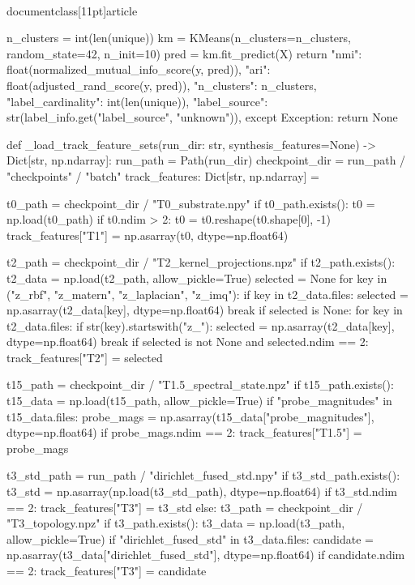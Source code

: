 \\documentclass[11pt]{article}
\begin{document}
\begin{CodeBlock}
        n_clusters = int(len(unique))
        km = KMeans(n_clusters=n_clusters, random_state=42, n_init=10)
        pred = km.fit_predict(X)
        return {
            "nmi": float(normalized_mutual_info_score(y, pred)),
            "ari": float(adjusted_rand_score(y, pred)),
            "n_clusters": n_clusters,
            "label_cardinality": int(len(unique)),
            "label_source": str(label_info.get("label_source", "unknown")),
        }
    except Exception:
        return None


def _load_track_feature_sets(run_dir: str, synthesis_features=None) -> Dict[str, np.ndarray]:
    run_path = Path(run_dir)
    checkpoint_dir = run_path / "checkpoints" / "batch"
    track_features: Dict[str, np.ndarray] = {}

    t0_path = checkpoint_dir / "T0_substrate.npy"
    if t0_path.exists():
        t0 = np.load(t0_path)
        if t0.ndim > 2:
            t0 = t0.reshape(t0.shape[0], -1)
        track_features["T1"] = np.asarray(t0, dtype=np.float64)

    t2_path = checkpoint_dir / "T2_kernel_projections.npz"
    if t2_path.exists():
        t2_data = np.load(t2_path, allow_pickle=True)
        selected = None
        for key in ("z_rbf", "z_matern", "z_laplacian", "z_imq"):
            if key in t2_data.files:
                selected = np.asarray(t2_data[key], dtype=np.float64)
                break
        if selected is None:
            for key in t2_data.files:
                if str(key).startswith("z_"):
                    selected = np.asarray(t2_data[key], dtype=np.float64)
                    break
        if selected is not None and selected.ndim == 2:
            track_features["T2"] = selected

    t15_path = checkpoint_dir / "T1.5_spectral_state.npz"
    if t15_path.exists():
        t15_data = np.load(t15_path, allow_pickle=True)
        if "probe_magnitudes" in t15_data.files:
            probe_mags = np.asarray(t15_data["probe_magnitudes"], dtype=np.float64)
            if probe_mags.ndim == 2:
                track_features["T1.5"] = probe_mags

    t3_std_path = run_path / "dirichlet_fused_std.npy"
    if t3_std_path.exists():
        t3_std = np.asarray(np.load(t3_std_path), dtype=np.float64)
        if t3_std.ndim == 2:
            track_features["T3"] = t3_std
    else:
        t3_path = checkpoint_dir / "T3_topology.npz"
        if t3_path.exists():
            t3_data = np.load(t3_path, allow_pickle=True)
            if "dirichlet_fused_std" in t3_data.files:
                candidate = np.asarray(t3_data["dirichlet_fused_std"], dtype=np.float64)
                if candidate.ndim == 2:
                    track_features["T3"] = candidate


\end{CodeBlock}
\end{document}
